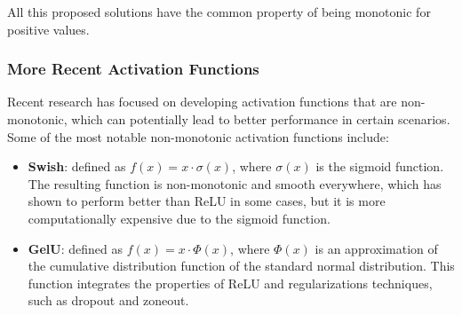All this proposed solutions have the common property of being monotonic for positive values.

\subsubsection{More Recent Activation Functions}
Recent research has focused on developing activation functions that are non-monotonic, which can potentially lead to better performance in certain scenarios.
Some of the most notable non-monotonic activation functions include:
\begin{itemize}
    \item \textbf{Swish}: defined as $f(x) = x \cdot \sigma(x)$, where $\sigma(x)$ is the sigmoid function.
    The resulting function is non-monotonic and smooth everywhere, which has shown to perform better than ReLU in some cases, but
    it is more computationally expensive due to the sigmoid function.
    \begin{figure}[H]
        \centering
        
    \end{figure}

    \item \textbf{GelU}: defined as $f(x) = x \cdot \Phi(x)$, where $\Phi(x)$ is an approximation of the cumulative
    distribution function of the standard normal distribution.
    This function integrates the properties of ReLU and regularizations techniques, such as dropout and zoneout.
    \begin{figure}[H]
        \centering
        
    \end{figure}
\end{itemize}